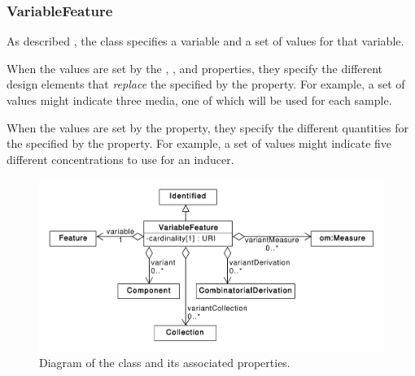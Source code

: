 \subsubsection{VariableFeature}
\label{sec:sbol:VariableFeature}

As described , the  class specifies a variable and a set of values for that variable.

When the values are set by the , , and  properties, they specify the different design elements that {\em replace} the  specified by the  property.
For example, a set of  values might indicate three media, one of which will be used for each sample.

When the values are set by the  property, they specify the different quantities for the  specified by the  property.
For example, a set of  values might indicate five different concentrations to use for an inducer.

\begin{figure}[ht]
\begin{center}
\includegraphics[scale=0.6]{sbol_uml/variable_component}
\caption[]{Diagram of the  class and its associated properties.}
\label{uml:variable_component}
\end{center}
\end{figure}

